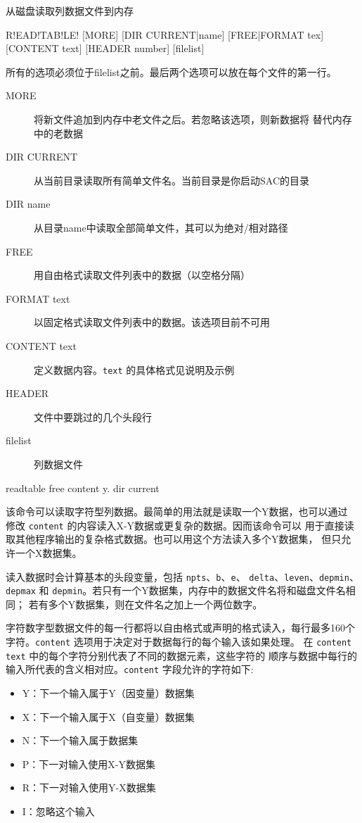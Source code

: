 \label{cmd:readtable}

从磁盘读取列数据文件到内存

\begin{SACSTX}
R!EAD!TAB!LE! [MORE] [DIR CURRENT|name] [FREE|FORMAT tex]
    [CONTENT text] [HEADER number] [filelist]
\end{SACSTX}
所有的选项必须位于filelist之前。最后两个选项可以放在每个文件的第一行。

\begin{description}
\item [MORE] 将新文件追加到内存中老文件之后。若忽略该选项，则新数据将
    替代内存中的老数据
\item [DIR CURRENT] 从当前目录读取所有简单文件名。当前目录是你启动SAC的目录
\item [DIR name] 从目录name中读取全部简单文件，其可以为绝对/相对路径
\item [FREE] 用自由格式读取文件列表中的数据（以空格分隔）
\item [FORMAT text] 以固定格式读取文件列表中的数据。该选项目前不可用
\item [CONTENT text] 定义数据内容。\texttt{text} 的具体格式见说明及示例
\item [HEADER] 文件中要跳过的几个头段行
\item [filelist] 列数据文件
\end{description}

\begin{SACDFT}
readtable free content y. dir current
\end{SACDFT}

该命令可以读取字符型列数据。最简单的用法就是读取一个Y数据，也可以通过
修改 \texttt{content} 的内容读入X-Y数据或更复杂的数据。因而该命令可以
用于直接读取其他程序输出的复杂格式数据。也可以用这个方法读入多个Y数据集，
但只允许一个X数据集。

读入数据时会计算基本的头段变量，包括 \texttt{npts}、\texttt{b}、\texttt{e}、
\texttt{delta}、\texttt{leven}、\texttt{depmin}、\texttt{depmax} 和
\texttt{depmin}。若只有一个Y数据集，内存中的数据文件名将和磁盘文件名相同；
若有多个Y数据集，则在文件名之加上一个两位数字。

字符数字型数据文件的每一行都将以自由格式或声明的格式读入，每行最多160个
字符。\texttt{content} 选项用于决定对于数据每行的每个输入该如果处理。
在 \texttt{content text} 中的每个字符分别代表了不同的数据元素，这些字符的
顺序与数据中每行的输入所代表的含义相对应。\texttt{content} 字段允许的字符如下:
\begin{itemize}
\item Y：下一个输入属于Y（因变量）数据集
\item X：下一个输入属于X（自变量）数据集
\item N：下一个输入属于数据集
\item P：下一对输入使用X-Y数据集
\item R：下一对输入使用Y-X数据集
\item I：忽略这个输入
\end{itemize}

